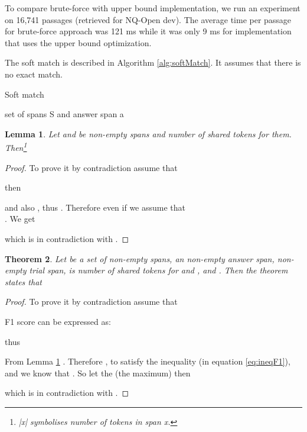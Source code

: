 \documentclass[11pt]{article}
\newtheorem{theorem}{Theorem}[section]
\newtheorem{lemma}[theorem]{Lemma}
\begin{document}
To compare brute-force with upper bound implementation, we run an experiment on 16,741 passages (retrieved for NQ-Open dev). The average time per passage for brute-force approach was 121 ms while it was only 9 ms for implementation that uses the upper bound optimization.

The soft match is described in Algorithm \ref{alg:softMatch}. It assumes that there is no exact match.

\begin{algorithm}
    \caption{Soft match}
    \label{alg:softMatch}
    
    \begin{algorithmic}[1]
    \Require set of spans S and answer span a
        \State 
        \State 
        \State 
        \State 
        
        \While{}
                \State 
                \If{}
                    \State 
                    \State 
                    \State 
                \EndIf
            \EndFor
            \State 
        \EndWhile
    \State \Return 
    \EndFunction
    \end{algorithmic}
\end{algorithm}


\begin{lemma}
\label{lem:upBounIsGreater}
Let  and  be non-empty spans and  number of shared tokens for them. Then\footnote{|x| symbolises number of tokens in span x.} 

\end{lemma}
\begin{proof}

To prove it by contradiction assume that

then


and also , thus . Therefore even if we assume that\\. We get


which is in contradiction with .
\end{proof}

\begin{theorem}
\label{the:F1worthSearchingTheorem}
Let  be a set of non-empty spans,  an non-empty answer span,  non-empty trial span,  is number of shared tokens for  and , and . Then the theorem states that 


\end{theorem}
\begin{proof}
To prove it by contradiction assume that



F1 score can be expressed as:


thus 


From Lemma \ref{lem:upBounIsGreater} . Therefore , to satisfy the inequality (in equation \ref{eq:ineqF1}), and we know that . So let the  (the maximum) then


which is in contradiction with .
\end{proof}
\end{document}
